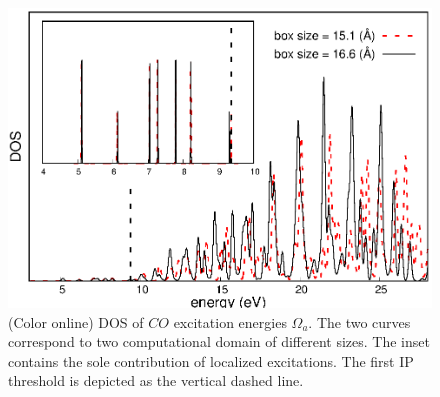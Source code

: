 \documentclass[reprint,aps,prb]{revtex4-1}
\begin{document}
\begin{figure}[ht]
\includegraphics[scale=0.6]{Fig4_CO_dos_rev1.eps} %
\caption{(Color online) DOS of $CO$ excitation energies $\Omega_a$. The two curves correspond to two computational domain of different sizes. The inset contains the sole contribution of localized excitations. The first IP threshold is depicted as the vertical dashed line.}
\label{CO_exc}
\end{figure}
\end{document}
